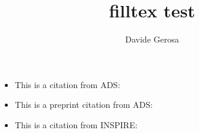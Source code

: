 \documentclass[]{article}
\begin{document}
\title{filltex test}

\author{Davide Gerosa}

\maketitle


\begin{itemize}
\item This is a citation from ADS: \cite{2016PhRvL.116f1102A}
\item This is a preprint citation from ADS: \cite{2016arXiv160203837T}
\item This is a citation from INSPIRE: \cite{Abbott:2016blz}
\end{itemize}



\end{document}
